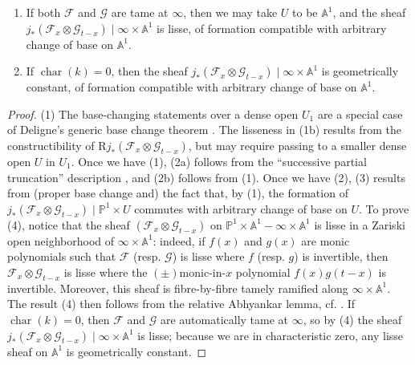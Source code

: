 \begin{enumerate}[label=(\arabic*)]
\[\begin{aligned}
    &\to (K*_!L)_t
    \to (K*_{\mathrm{mid}}L)_t
    \to 0,
  \end{aligned}
\]
which is the fibre at \(t\) of a short exact sequence of perverse sheaves on
\(U\)
\[
  0\to
  (\text{the lisse sheaf }j_*(\mathcal{F}_x\otimes\mathcal{G}_{t-x})
  \mid\infty\times U)[1]
  \to K*_!+L
  \to K*_{\mathrm{mid}}+L
  \to 0.
\]
\item If both \(\mathcal{F}\) and \(\mathcal{G}\) are tame at \(\infty\), then
we may take \(U\) to be \(\mathbb{A}^1\), and the sheaf
\(j_*(\mathcal{F}_x\otimes\mathcal{G}_{t-x})\mid
\infty\times\mathbb{A}^1\) is lisse, of formation compatible with arbitrary
change of base on \(\mathbb{A}^1\).
\item If \(\operatorname{char}(k)=0\), then the sheaf
\(j_*(\mathcal{F}_x\otimes\mathcal{G}_{t-x})\mid
\infty\times\mathbb{A}^1\) is geometrically constant, of formation compatible
with arbitrary change of base on \(\mathbb{A}^1\).
\end{enumerate}

\begin{proof}
(1) The base-changing statements over a dense open \(U_1\) are a special case
of Deligne's generic base change theorem \cite[Cor.~2.9]{De-ThFin}.
The lisseness in (1b) results from the constructibility of
\(\mathrm{R}j_*(\mathcal{F}_x\otimes\mathcal{G}_{t-x})\), but may require
passing to a smaller dense open \(U\) in \(U_1\). Once we have (1), (2a)
follows from the ``successive partial truncation'' description
\cite[2.2.4]{BBD}, and (2b) follows from (1). Once we
have (2), (3) results from (proper base change and) the fact that, by (1), the
formation of \(j_*(\mathcal{F}_x\otimes\mathcal{G}_{t-x})\mid
\mathbb{P}^1\times U\) commutes with arbitrary change of base on \(U\). To
prove (4), notice that the sheaf \((\mathcal{F}_x\otimes\mathcal{G}_{t-x})\)
on \(\mathbb{P}^1\times\mathbb{A}^1-\infty\times\mathbb{A}^1\) is lisse in a
Zariski open neighborhood of \(\infty\times\mathbb{A}^1\): indeed, if \(f(x)\)
and \(g(x)\) are monic polynomials such that \(\mathcal{F}\) (resp.
\(\mathcal{G}\)) is lisse where \(f\) (resp. \(g\)) is invertible, then
\(\mathcal{F}_x\otimes\mathcal{G}_{t-x}\) is lisse where the
\((\pm)\)monic-in-\(x\) polynomial \(f(x)g(t-x)\) is invertible. Moreover,
this sheaf is fibre-by-fibre tamely ramified along
\(\infty\times\mathbb{A}^1\). The result (4) then follows from the relative
Abhyankar lemma, cf. \cite[4.7.2]{Ka-SE}. If
\(\operatorname{char}(k)=0\), then \(\mathcal{F}\) and \(\mathcal{G}\) are
automatically tame at \(\infty\), so by (4) the sheaf
\(j_*(\mathcal{F}_x\otimes\mathcal{G}_{t-x})\mid\infty\times\mathbb{A}^1\) is
lisse; because we are in characteristic zero, any lisse sheaf on
\(\mathbb{A}^1\) is geometrically constant.
\end{proof}

